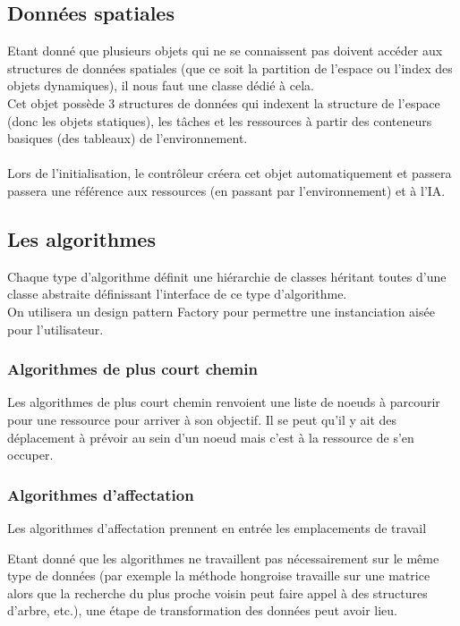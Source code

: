\subsection{Données spatiales}

Etant donné que plusieurs objets qui ne se connaissent pas doivent accéder aux structures de données spatiales (que ce soit la partition de l'espace ou l'index des objets dynamiques), il nous faut une classe dédié à cela.\\
Cet objet possède 3 structures de données qui indexent la structure de l'espace (donc les objets statiques), les tâches et les ressources à partir des conteneurs basiques (des tableaux) de l'environnement.\\\\

Lors de l'initialisation, le contrôleur créera cet objet automatiquement et passera passera une référence aux ressources (en passant par l'environnement) et à l'IA.

\subsection{Les algorithmes}
Chaque type d'algorithme définit une hiérarchie de classes héritant toutes d'une classe abstraite définissant l'interface de ce type d'algorithme.\\
On utilisera un design pattern Factory pour permettre une instanciation aisée pour l'utilisateur.

\subsubsection{Algorithmes de plus court chemin}

Les algorithmes de plus court chemin renvoient une liste de noeuds à parcourir pour une ressource pour arriver à son objectif. Il se peut qu'il y ait des déplacement à prévoir au sein d'un noeud mais c'est à la ressource de s'en occuper.

\subsubsection{Algorithmes d'affectation}

Les algorithmes d'affectation prennent en entrée les emplacements de travail 

Etant donné que les algorithmes ne travaillent pas nécessairement sur le même type de données (par exemple la méthode hongroise travaille sur une matrice alors que la recherche du plus proche voisin peut faire appel à des structures d'arbre, etc.), une étape de transformation des données peut avoir lieu.

